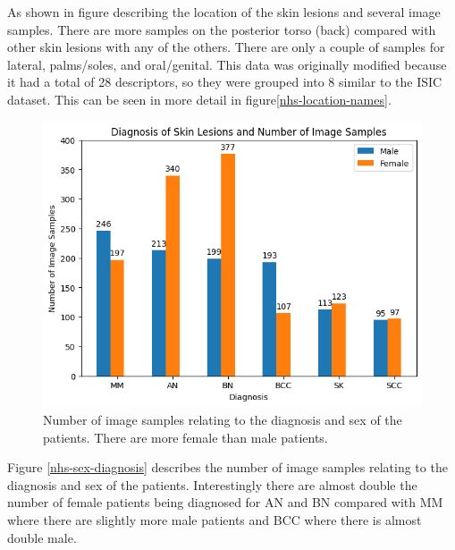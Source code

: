 As shown in figure\cite{nhs-location} describing the location of the skin lesions and several image samples. There are more samples on the posterior torso (back) compared with other skin lesions with any of the others. There are only a couple of samples for lateral, palms/soles, and oral/genital. This data was originally modified because it had a total of 28 descriptors, so they were grouped into 8 similar to the ISIC dataset. This can be seen in more detail in figure\ref{nhs-location-names}.

\begin{figure}
    \centering
    \includegraphics[scale=0.75]{images/nhs/nhs-sex-diagnosis.png}
    \caption{Number of image samples relating to the diagnosis and sex of the patients. There are more female than male patients.} 
\end{figure}\label{nhs-sex-diagnosis}

Figure \ref{nhs-sex-diagnosis} describes the number of image samples relating to the diagnosis and sex of the patients. Interestingly there are almost double the number of female patients being diagnosed for AN and BN compared with MM where there are slightly more male patients and BCC where there is almost double male.

